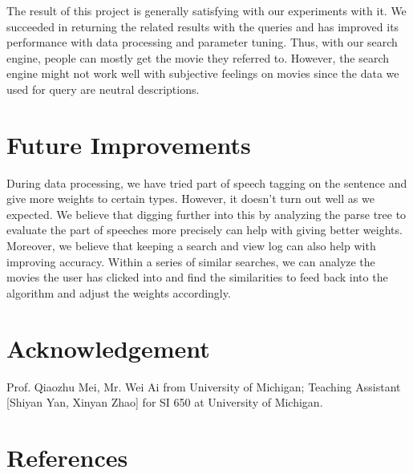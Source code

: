 \documentclass[letterpaper,10pt]{article}
\begin{document}
\begin{multicols}{2}
    The result of this project is generally satisfying with our experiments with it. We succeeded in returning the related results with the queries and has improved its performance with data processing and parameter tuning. Thus, with our search engine, people can mostly get the movie they referred to. However, the search engine might not work well with subjective feelings on movies since the data we used for query are neutral descriptions.

    \section{Future Improvements}
    During data processing, we have tried part of speech tagging on the sentence and give more weights to certain types. However, it doesn’t turn out well as we expected. We believe that digging further into this by analyzing the parse tree to evaluate the part of speeches more precisely can help with giving better weights.
    Moreover, we believe that keeping a search and view log can also help with improving accuracy. Within a series of similar searches, we can analyze the movies the user has clicked into and find the similarities to feed back into the algorithm and adjust the weights accordingly.

    \section{Acknowledgement}

    Prof. Qiaozhu Mei, Mr. Wei Ai from University of Michigan;
    Teaching Assistant [Shiyan Yan, Xinyan Zhao] for SI 650 at University of Michigan.

    \section*{References}





\end{multicols}
\end{document}
